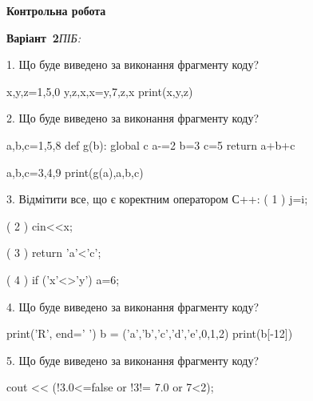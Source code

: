 \documentclass[11pt]{article}
\begin{document}
{\large\textbf{Контрольна робота}}

\textbf{Варіант \No\,2}\hfill \textit{ПІБ:}\,\underline{\hspace{60mm}}
\vspace{4mm}

1. Що буде виведено за виконання фрагменту коду?

x,y,z=1,5,0
y,z,x,x=y,7,z,x
print(x,y,z)
\vspace{5mm}

2. Що буде виведено за виконання фрагменту коду?

a,b,c=1,5,8
def g(b):
global c    a-=2
    b=3
    c=5
    return a+b+c

a,b,c=3,4,9
print(g(a),a,b,c)
\vspace{5mm}

3. %
Відмітити все, що є коректним оператором С++:
( 1 ) j=i;

( 2 ) cin<<x;

( 3 ) return 'a'<'c';

( 4 ) if ('x'<>'y') a=6;
\vspace{5mm}

4. Що буде виведено за виконання фрагменту коду?

print('R', end=' ')
b = ('a','b','c','d','e',0,1,2)
print(b[-12])

\vspace{5mm}

5. Що буде виведено за виконання фрагменту коду?

cout << (!3.0<=false or !3!= 7.0 or 7<2);
\vspace{5mm}

\newpage
\end{document}
